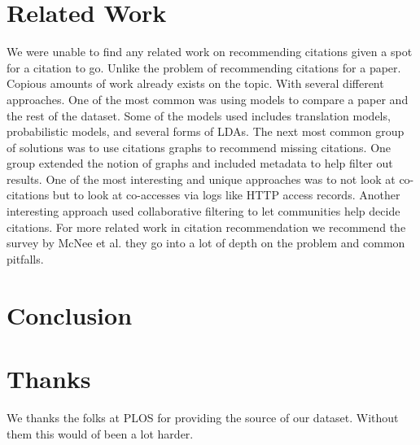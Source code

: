 \documentclass[10pt, conference, compsocconf]{IEEEtran}
\begin{document}
\section{Related Work}\label{sec:related}
We were unable to find any related work on recommending citations given a spot for a citation to go. Unlike the problem of recommending citations for a paper. Copious amounts of work already exists on the topic. With several different approaches. One of the most common was using models to compare a paper and the rest of the dataset. Some of the models used includes translation models, probabilistic models, and several forms of LDAs.\cite{cite1, cite2, cite3} The next most common group of solutions was to use citations graphs to recommend missing citations.\cite{cite6} One group extended the notion of graphs and included metadata to help filter out results.\cite{cite4} One of the most 
interesting and unique approaches was to not look at co-citations but to look at co-accesses via logs like HTTP access records.\cite{cite7} 
Another interesting approach used collaborative filtering to let communities help decide citations.\cite{cite8} For more related work in
citation recommendation we recommend the survey by McNee et al. they go into a lot of depth on the problem and common pitfalls.\cite{cite5}

\section{Conclusion}\label{sec:conclusion}

\section{Thanks}
We thanks the folks at PLOS for providing the source of our dataset. Without them this would of been a lot harder.



\end{document}
